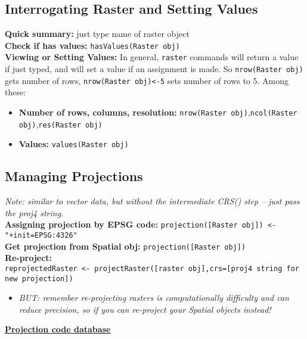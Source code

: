\documentclass[10pt]{article}
\begin{document}

\hrulefill
\subsection*{Interrogating Raster and Setting Values}
\textbf{Quick summary:} just type name of raster object \\
\textbf{Check if has values:} \texttt{hasValues(Raster obj)}\\
\textbf{Viewing or Setting Values:} In general, \texttt{raster} commands will return a value if just typed, and will set a value if an assignment is made. So \texttt{nrow(Raster obj)} gets number of rows, \texttt{nrow(Raster obj)<-5} sets number of rows to 5. Among these:
\begin{itemize}
	\item \textbf{Number of rows, columns, resolution:} \texttt{nrow(Raster obj)},\texttt{ncol(Raster obj)},\texttt{res(Raster obj)}
	\item \textbf{Values:} \texttt{values(Raster obj)}\\
\end{itemize}


\hrulefill 
\subsection*{Managing Projections} 
\emph{Note: similar to vector data, but without the intermediate CRS() step -- just pass the proj4 string.}\\
\textbf{Assigning projection by EPSG code:} \texttt{projection([Raster obj]) <-"+init=EPSG:4326"}\\
\textbf{Get projection from Spatial obj:} \texttt{projection([Raster obj])} \\
\textbf{Re-project:} \\
\hspace*{0.3cm}\texttt{reprojectedRaster <- projectRaster([raster obj],crs=[proj4 string for new projection])}
\begin{itemize}
	\item \emph{BUT: remember re-projecting rasters is computationally difficulty and can reduce precision, so if you can re-project your Spatial\* objects instead!}
\end{itemize}
\vspace{0.1cm}
\href{http://www.spatialreference.org/}{\underline{\textbf{Projection code database}}}
\end{document}
